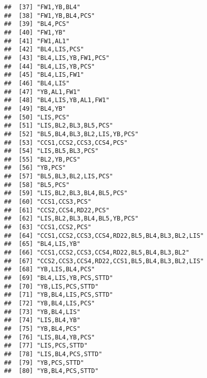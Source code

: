 \documentclass[
]{article}
\begin{document}
\begin{verbatim}
##  [37] "FW1,YB,BL4"                                      
##  [38] "FW1,YB,BL4,PCS"                                  
##  [39] "BL4,PCS"                                         
##  [40] "FW1,YB"                                          
##  [41] "FW1,AL1"                                         
##  [42] "BL4,LIS,PCS"                                     
##  [43] "BL4,LIS,YB,FW1,PCS"                              
##  [44] "BL4,LIS,YB,PCS"                                  
##  [45] "BL4,LIS,FW1"                                     
##  [46] "BL4,LIS"                                         
##  [47] "YB,AL1,FW1"                                      
##  [48] "BL4,LIS,YB,AL1,FW1"                              
##  [49] "BL4,YB"                                          
##  [50] "LIS,PCS"                                         
##  [51] "LIS,BL2,BL3,BL5,PCS"                             
##  [52] "BL5,BL4,BL3,BL2,LIS,YB,PCS"                      
##  [53] "CCS1,CCS2,CCS3,CCS4,PCS"                         
##  [54] "LIS,BL5,BL3,PCS"                                 
##  [55] "BL2,YB,PCS"                                      
##  [56] "YB,PCS"                                          
##  [57] "BL5,BL3,BL2,LIS,PCS"                             
##  [58] "BL5,PCS"                                         
##  [59] "LIS,BL2,BL3,BL4,BL5,PCS"                         
##  [60] "CCS1,CCS3,PCS"                                   
##  [61] "CCS2,CCS4,RD22,PCS"                              
##  [62] "LIS,BL2,BL3,BL4,BL5,YB,PCS"                      
##  [63] "CCS1,CCS2,PCS"                                   
##  [64] "CCS1,CCS2,CCS3,CCS4,RD22,BL5,BL4,BL3,BL2,LIS"    
##  [65] "BL4,LIS,YB"                                      
##  [66] "CCS1,CCS2,CCS3,CCS4,RD22,BL5,BL4,BL3,BL2"        
##  [67] "CCS2,CCS3,CCS4,RD22,CCS1,BL5,BL4,BL3,BL2,LIS"    
##  [68] "YB,LIS,BL4,PCS"                                  
##  [69] "BL4,LIS,YB,PCS,STTD"                             
##  [70] "YB,LIS,PCS,STTD"                                 
##  [71] "YB,BL4,LIS,PCS,STTD"                             
##  [72] "YB,BL4,LIS,PCS"                                  
##  [73] "YB,BL4,LIS"                                      
##  [74] "LIS,BL4,YB"                                      
##  [75] "YB,BL4,PCS"                                      
##  [76] "LIS,BL4,YB,PCS"                                  
##  [77] "LIS,PCS,STTD"                                    
##  [78] "LIS,BL4,PCS,STTD"                                
##  [79] "YB,PCS,STTD"                                     
##  [80] "YB,BL4,PCS,STTD"                                 

\end{verbatim}
\end{document}
